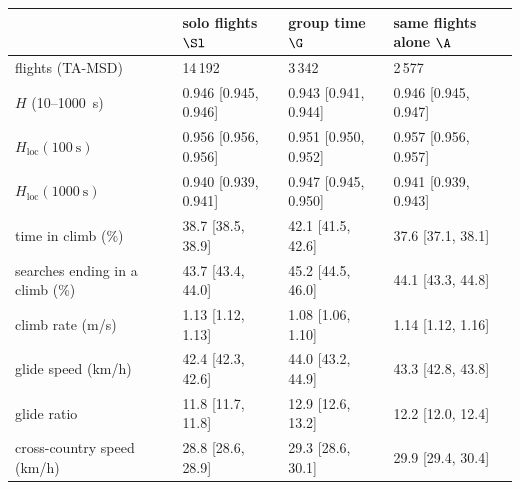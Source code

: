 \begin{tabular}{@{}l l l l@{}}
\toprule
 & solo flights $\Sl$ & group time $\G$ & same flights alone $\A$ \\
\midrule
flights (TA-MSD) & 14\,192 & 3\,342 & 2\,577 \\
$H$ (10--1000~s) & 0.946 [0.945, 0.946] & 0.943 [0.941, 0.944] & 0.946 [0.945, 0.947] \\
$H_\mathrm{loc}(100~\mathrm{s})$ & 0.956 [0.956, 0.956] & 0.951 [0.950, 0.952] & 0.957 [0.956, 0.957] \\
$H_\mathrm{loc}(1000~\mathrm{s})$ & 0.940 [0.939, 0.941] & 0.947 [0.945, 0.950] & 0.941 [0.939, 0.943] \\
time in climb (\%) & 38.7 [38.5, 38.9] & 42.1 [41.5, 42.6] & 37.6 [37.1, 38.1] \\
searches ending in a climb (\%) & 43.7 [43.4, 44.0] & 45.2 [44.5, 46.0] & 44.1 [43.3, 44.8] \\
climb rate (m/s) & 1.13 [1.12, 1.13] & 1.08 [1.06, 1.10] & 1.14 [1.12, 1.16] \\
glide speed (km/h) & 42.4 [42.3, 42.6] & 44.0 [43.2, 44.9] & 43.3 [42.8, 43.8] \\
glide ratio & 11.8 [11.7, 11.8] & 12.9 [12.6, 13.2] & 12.2 [12.0, 12.4] \\
cross-country speed (km/h) & 28.8 [28.6, 28.9] & 29.3 [28.6, 30.1] & 29.9 [29.4, 30.4] \\
\bottomrule
\end{tabular}
